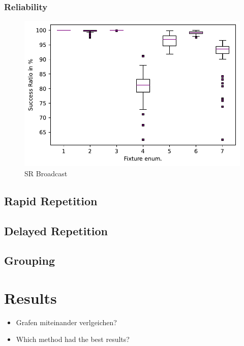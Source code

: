 \subsubsection{Reliability}


\begin{figure}[h]
	\centering
	\includegraphics[scale=0.6]{../Plot2/Graphs/SR_per_fixture_broadcast.pdf}
	\caption{SR Broadcast}
	\label{fig:sr_broadcast}
\end{figure}

\subsection*{Rapid Repetition}
\subsection*{Delayed Repetition}
\subsection*{Grouping}

\section{Results}
\begin{itemize}
	\item Grafen miteinander verlgeichen?
	\item Which method had the best results?
\end{itemize}

